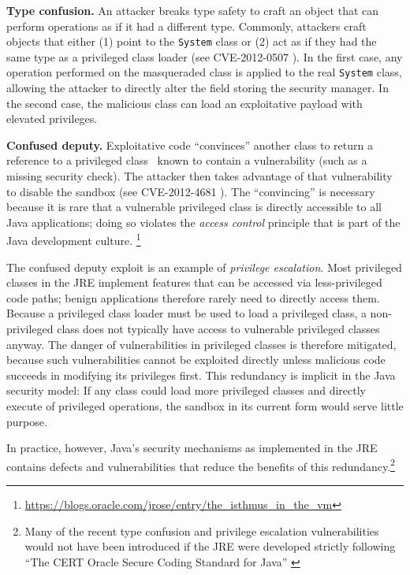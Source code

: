 \documentclass{sig-alternate}
\begin{document}
\noindent\textbf{Type confusion.} An attacker breaks type
safety to craft an object that can perform operations as if it had
a different type. Commonly, attackers craft objects that either
(1) point to the \texttt{System} class or (2) act as if they had
the same type as a privileged class loader (see CVE-2012-0507 \cite{_vulnerability_2012_0507}).
In the first case, any operation performed on the
masqueraded class is applied to the real \texttt{System} class, allowing
the attacker to directly alter the field storing the security manager. 
In the second case, the malicious class can load an exploitative
payload with elevated privileges.

\noindent\textbf{Confused deputy.} Exploitative code ``convinces'' another
class to return a reference to a privileged class~\cite{hardy_confused_1988}
known to contain a vulnerability (such as a missing security check).  The
attacker then takes advantage of that vulnerability to disable the sandbox 
(see CVE-2012-4681 \cite{_vulnerability_2012_4681}).
The ``convincing'' is necessary
because it is rare that a vulnerable privileged class is directly accessible
to all Java applications; doing so violates the \textit{access
control} principle that is part of the Java development culture.%
\footnote{\url{https://blogs.oracle.com/jrose/entry/the_isthmus_in_the_vm}%
} 

The confused deputy exploit is an example of \emph{privilege escalation}.  Most
privileged classes in the JRE implement features that can be accessed via
less-privileged code paths; benign applications therefore rarely need to
directly access them. 
Because a privileged class loader must be used to load a privileged class, 
a non-privileged class does not typically have access to vulnerable
privileged classes anyway. The danger of vulnerabilities in privileged
classes is therefore mitigated, because such vulnerabilities cannot be exploited
directly unless malicious code succeeds in modifying its privileges first. 
This redundancy is implicit in the Java security model: If any class
could load more privileged classes and directly execute
of privileged operations, the sandbox in its current form would serve
little purpose. 

In practice, however, Java's security mechanisms as implemented
in the JRE contains defects and vulnerabilities that reduce the benefits of
this redundancy.\footnote{Many of the recent type confusion and privilege escalation vulnerabilities
would not have been introduced if the JRE were developed strictly
following ``The CERT Oracle Secure Coding Standard for Java'' \cite{long_cert_2011,svoboda_anatomy_blog_2013,svoboda_anatomy_2014}}
  
\end{document}
